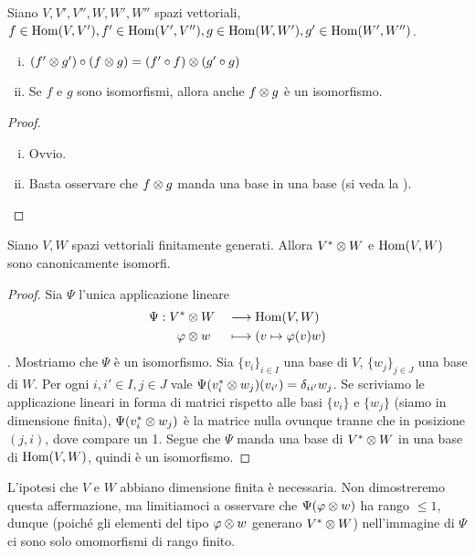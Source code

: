 \begin{proposition}
Siano $V\comma V'\comma V''\comma W\comma W'\comma W''$ spazi vettoriali, $f\in\operatorname{Hom}(V,V'),\allowbreak f'\in\operatorname{Hom}(V',V''),\allowbreak g\in\operatorname{Hom}(W,W'),\allowbreak g'\in\operatorname{Hom}(W',W'')$.
\begin{enumerate}[(i)]
\item $(f'\otimes g')\circ(f\otimes g)=(f'\circ f)\otimes(g'\circ g)$
\item Se $f$ e $g$ sono isomorfismi, allora anche $f\otimes g$ è un isomorfismo.
\end{enumerate}
\end{proposition}
\begin{proof}\leavevmode
\begin{enumerate}[(i)]
\item Ovvio.
\item Basta osservare che $f\otimes g$ manda una base in una base (si veda la ).
\end{enumerate}
\end{proof}

\begin{proposition}
Siano $V\comma W$ spazi vettoriali finitamente generati. Allora $V^*\otimes W$ e $\operatorname{Hom}(V,W)$ sono canonicamente isomorfi.
\end{proposition}
\begin{proof}
Sia $\Psi$ l'unica applicazione lineare
\begin{alignat*}{2}
\Psi:V^*&\otimes W&&\longrightarrow\operatorname{Hom}(V,W)\\
\varphi&\otimes w&&\longmapsto(v\mapsto \varphi(v)w)
\end{alignat*}
. Mostriamo che $\Psi$ è un isomorfismo. Sia $\{v_i\}_{i\in I}$ una base di $V$, $\{w_j\}_{j\in J}$ una base di $W$. Per ogni $i,i'\in I\comma j\in J$ vale $\Psi(v_i^*\otimes w_j)(v_{i'})=\delta_{ii'}w_j$. Se scriviamo le applicazione lineari in forma di matrici rispetto alle basi $\{v_i\}$ e $\{w_j\}$ (siamo in dimensione finita), $\Psi(v_i^*\otimes w_j)$ è la matrice nulla ovunque tranne che in posizione $(j,i)$, dove compare un 1. Segue che $\Psi$ manda una base di $V^*\otimes W$ in una base di $\operatorname{Hom}(V,W)$, quindi è un isomorfismo.
\end{proof}

\begin{remark}
L'ipotesi che $V$ e $W$ abbiano dimensione finita è necessaria. Non dimostreremo questa affermazione, ma limitiamoci a osservare che $\Psi(\varphi\otimes w)$ ha rango $\le 1$, dunque (poiché gli elementi del tipo $\varphi\otimes w$ generano $V^*\otimes W$) nell'immagine di $\Psi$ ci sono solo omomorfismi di rango finito.
\end{remark}

